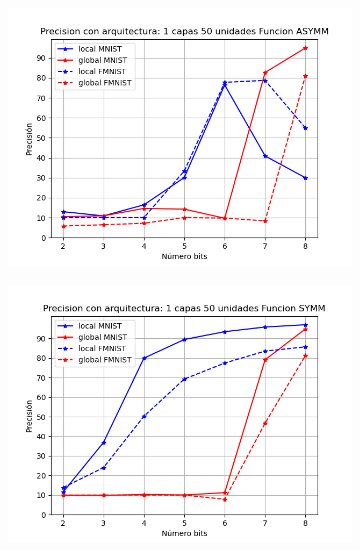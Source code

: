\begin{figure}[H]
    \centering
    \begin{subfigure}[H]{0.475\textwidth}
    \includegraphics[width=\textwidth]{imagenes/backprop/Precision con arquitectura: 1 capas 50 unidades Funcion ASYMM.png}
    \end{subfigure}
    \begin{subfigure}[H]{0.475\textwidth}
    \includegraphics[width=\textwidth]{imagenes/backprop/Precision con arquitectura: 1 capas 50 unidades Funcion SYMM.png}
    \end{subfigure}
    \begin{subfigure}[H]{0.475\textwidth}

\end{subfigure}
\end{figure}
